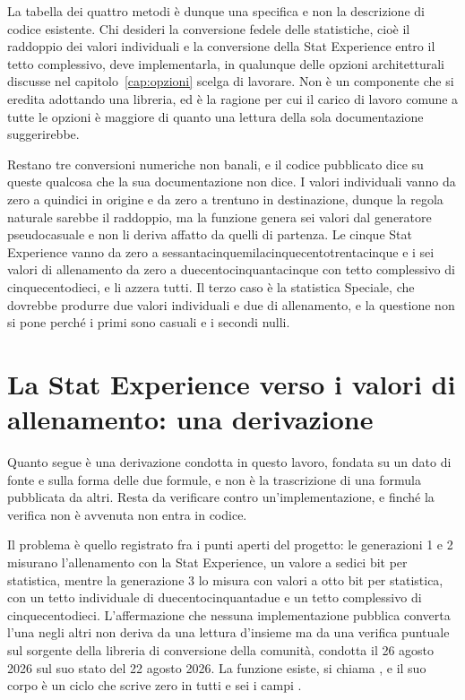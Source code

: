 La tabella dei quattro metodi è dunque una specifica e non la descrizione di codice esistente. Chi desideri la conversione fedele delle statistiche, cioè il raddoppio dei valori individuali e la conversione della Stat Experience entro il tetto complessivo, deve implementarla, in qualunque delle opzioni architetturali discusse nel capitolo~\ref{cap:opzioni} scelga di lavorare. Non è un componente che si eredita adottando una libreria, ed è la ragione per cui il carico di lavoro comune a tutte le opzioni è maggiore di quanto una lettura della sola documentazione suggerirebbe.

Restano tre conversioni numeriche non banali, e il codice pubblicato dice su queste qualcosa che la sua documentazione non dice. I valori individuali vanno da zero a quindici in origine e da zero a trentuno in destinazione, dunque la regola naturale sarebbe il raddoppio, ma la funzione  genera sei valori dal generatore pseudocasuale e non li deriva affatto da quelli di partenza. Le cinque Stat Experience vanno da zero a sessantacinquemilacinquecentotrentacinque e i sei valori di allenamento da zero a duecentocinquantacinque con tetto complessivo di cinquecentodieci, e  li azzera tutti. Il terzo caso è la statistica Speciale, che dovrebbe produrre due valori individuali e due di allenamento, e la questione non si pone perché i primi sono casuali e i secondi nulli.

\section{La Stat Experience verso i valori di allenamento: una derivazione}

\begin{daverificare}
Quanto segue è una derivazione condotta in questo lavoro, fondata su un dato di fonte e sulla forma delle due formule, e non è la trascrizione di una formula pubblicata da altri. Resta da verificare contro un'implementazione, e finché la verifica non è avvenuta non entra in codice.
\end{daverificare}

Il problema è quello registrato fra i punti aperti del progetto: le generazioni 1 e 2 misurano l'allenamento con la Stat Experience, un valore a sedici bit per statistica, mentre la generazione 3 lo misura con valori a otto bit per statistica, con un tetto individuale di duecentocinquantadue e un tetto complessivo di cinquecentodieci. L'affermazione che nessuna implementazione pubblica converta l'una negli altri non deriva da una lettura d'insieme ma da una verifica puntuale sul sorgente della libreria di conversione della comunità, condotta il 26 agosto 2026 sul suo stato del 22 agosto 2026. La funzione esiste, si chiama , e il suo corpo è un ciclo che scrive zero in tutti e sei i campi \cite{pccs}.

